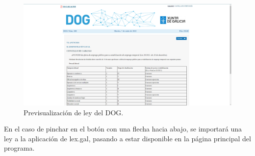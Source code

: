 \begin{figure}[H]
\centerline{\includegraphics[width=12cm]{figuras/manualUsuario/PrevisualizarDOG.PNG}}
\caption{Previsualización de ley del DOG.}
\label{enlacePrevisDOG}
\end{figure}

En el caso de pinchar en el botón con una flecha hacia abajo, se importará una ley a la aplicación de lex.gal, pasando a estar disponible en la página principal del programa.